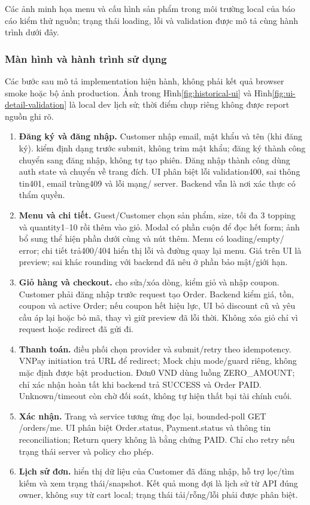 Các ảnh minh họa menu và cấu hình sản phẩm trong môi trường local của báo cáo kiểm thử nguồn; trạng thái loading, lỗi và validation được mô tả cùng hành trình dưới đây.

\subsubsection{Màn hình và hành trình sử dụng}
Các bước sau mô tả implementation hiện hành, không phải kết quả browser
smoke hoặc bộ ảnh production. Ảnh trong Hình\ref{fig:historical-ui} và
Hình\ref{fig:ui-detail-validation} là local dev lịch sử; thời điểm chụp
riêng không được report nguồn ghi rõ.
\begin{enumerate}
\item \textbf{Đăng ký và đăng nhập.} Customer nhập email, mật khẩu và tên
(khi đăng ký).  kiểm định dạng trước
submit, không trim mật khẩu; đăng ký thành công chuyển sang đăng nhập, không
tự tạo phiên. Đăng nhập thành công dùng auth state và chuyển về trang đích.
UI phân biệt lỗi validation400, sai thông tin401, email trùng409 và lỗi mạng/
server. Backend vẫn là nơi xác thực có thẩm quyền.
\item \textbf{Menu và chi tiết.} Guest/Customer chọn sản phẩm, size, tối đa
3 topping và quantity1--10 rồi thêm vào giỏ. Modal có phần cuộn để đọc hết
form; ảnh bổ sung thể hiện phần dưới cùng và nút thêm. Menu có loading/empty/
error; chi tiết trả400/404 hiển thị lỗi và đường quay lại menu. Giá trên UI
là preview; sai khác rounding với backend đã nêu ở phần bảo mật/giới hạn.
\item \textbf{Giỏ hàng và checkout.} 
cho sửa/xóa dòng, kiểm giỏ và nhập coupon. Customer phải đăng nhập trước
request tạo Order. Backend kiểm giá, tồn, coupon và active Order; nếu coupon
hết hiệu lực, UI bỏ discount cũ và yêu cầu áp lại hoặc bỏ mã, thay vì giữ
preview đã lỗi thời. Không xóa giỏ chỉ vì request hoặc redirect đã gửi đi.
\item \textbf{Thanh toán.} 
điều phối chọn provider và submit/retry theo idempotency. VNPay initiation
trả URL để redirect; Mock chịu mode/guard riêng, không mặc định được bật
production. Đơn0 VND dùng luồng ZERO\_AMOUNT; chỉ xác nhận hoàn tất khi
backend trả SUCCESS và Order PAID. Unknown/timeout còn chờ đối soát, không
tự hiện thất bại tài chính cuối.
\item \textbf{Xác nhận.} Trang 
và service tương ứng đọc lại, bounded-poll GET /orders/me. UI phân biệt
Order.status, Payment.status và thông tin reconciliation; Return query không
là bằng chứng PAID. Chỉ cho retry nếu trạng thái server và policy cho phép.
\item \textbf{Lịch sử đơn.} 
hiển thị dữ liệu của Customer đã đăng nhập, hỗ trợ lọc/tìm kiếm và xem trạng
thái/snapshot. Kết quả mong đợi là lịch sử từ API đúng owner, không suy từ
cart local; trạng thái tải/rỗng/lỗi phải được phân biệt.
\end{enumerate}
